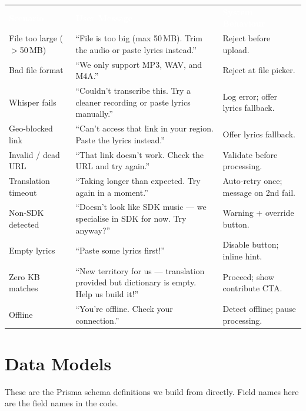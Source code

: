 \documentclass[12pt, a4paper]{article}
\begin{document}
\renewcommand{\arraystretch}{1.5}
\begin{center}
\begin{tabular}{L{3.8cm} L{5cm} L{4.8cm}}
  \textcolor{white}{\textbf{Scenario}} &
  \textcolor{white}{\textbf{User Message}} &
  \textcolor{white}{\textbf{System Behaviour}} \\
  File too large ($>$50\,MB) &
  ``File is too big (max 50\,MB). Trim the audio or paste lyrics instead.'' &
  Reject before upload. \\
  Bad file format &
  ``We only support MP3, WAV, and M4A.'' &
  Reject at file picker. \\
  Whisper fails &
  ``Couldn't transcribe this. Try a cleaner recording or paste lyrics manually.'' &
  Log error; offer lyrics fallback. \\
  Geo-blocked link &
  ``Can't access that link in your region. Paste the lyrics instead.'' &
  Offer lyrics fallback. \\
  Invalid / dead URL &
  ``That link doesn't work. Check the URL and try again.'' &
  Validate before processing. \\
  Translation timeout &
  ``Taking longer than expected. Try again in a moment.'' &
  Auto-retry once; message on 2nd fail. \\
  Non-SDK detected &
  ``Doesn't look like SDK music — we specialise in SDK for now. Try anyway?'' &
  Warning + override button. \\
  Empty lyrics &
  ``Paste some lyrics first!'' &
  Disable button; inline hint. \\
  Zero KB matches &
  ``New territory for us — translation provided but dictionary is empty. Help us build it!'' &
  Proceed; show contribute CTA. \\
  Offline &
  ``You're offline. Check your connection.'' &
  Detect offline; pause processing. \\
\end{tabular}
\end{center}

\section{Data Models}

\begin{tcolorbox}[warnbox]
  These are the Prisma schema definitions we build from directly.
  Field names here are the field names in the code.
\end{tcolorbox}
\end{document}

